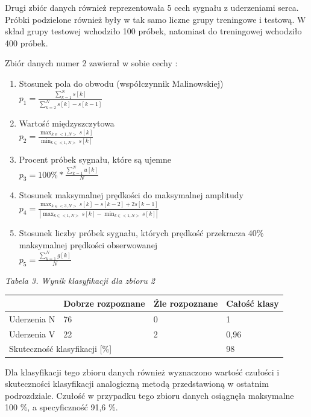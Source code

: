 \documentclass[[10pt,a4paper]{article}
\begin{document}
\begin{enumerate}
\noindent Drugi zbiór danych również reprezentowała 5 cech sygnału z uderzeniami serca. Próbki podzielone również były w tak samo liczne grupy treningowe i testową. W skład grupy testowej wchodziło 100 próbek, natomiast do treningowej wchodziło 400 próbek.

\noindent Zbiór danych numer 2 zawierał w sobie cechy :

\begin{enumerate}
\item  Stosunek pola do obwodu (współczynnik Malinowskiej) 
 \\$p_1 = \frac{\sum_{k=1}^{N} s[k]}{\sum_{k=2}^{N} s[k]-s[k-1]}$

\item  Wartość międzyszczytowa
\\$p_2 = \frac{\max_{k \in <1,N>} s[k]}{\min_{k \in <1,N>} s[k]}$

\item  Procent próbek sygnału, które są ujemne    \\$p_3 = 100\% * \frac{\sum_{k=1}^{N} u[k]}{N}$ 

\item  Stosunek maksymalnej prędkości do maksymalnej amplitudy 
\\$p_4 = \frac{\max_{k \in <3,N>} s[k]-s[k-2]+2s[k-1]}{|\max_{k \in <1,N>} s[k] - \min_{k \in <1,N>} s[k]|}$

\item  Stosunek liczby próbek sygnału, których prędkość przekracza 40\% maksymalnej prędkości obserwowanej 
\\$p_5 = \frac{\sum_{k=1}^{N} g[k]}{N}$

\end{enumerate}
\textit{Tabela 3. Wynik klasyfikacji dla zbioru 2}
\newline
\begin{tabular}{|p{1.2in}|p{1.0in}|p{1.0in}|p{1.0in}|} \hline 
 & Dobrze rozpoznane & \'{Z}le rozpoznane & Całość klasy  \\ \hline 
Uderzenia N & 76 & 0 & 1 \\ \hline 
Uderzenia V & 22 & 2 & 0,96 \\ \hline 
\multicolumn{3}{|p{1in}|}{Skuteczność klasyfikacji [\%] } & 98 \\ \hline 
\end{tabular}



\noindent Dla klasyfikacji tego zbioru danych również wyznaczono wartość czułości i skuteczności klasyfikacji analogiczną metodą przedstawioną w ostatnim podrozdziale. Czułość w przypadku tego zbioru danych osiągnęła maksymalne 100 \%, a specyficzność 91,6 \%.


\end{enumerate}
\end{document}
